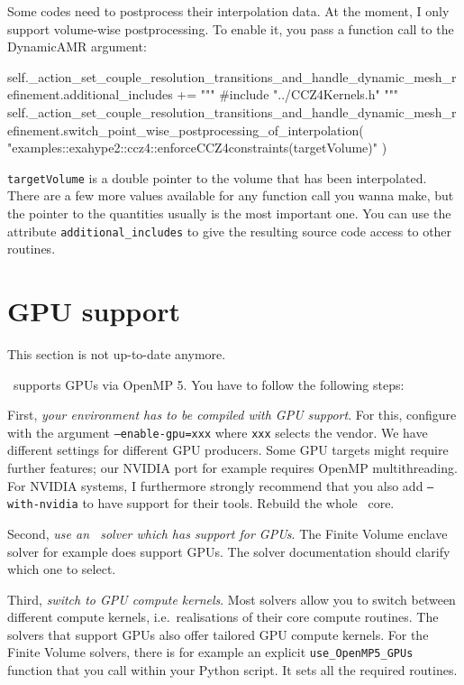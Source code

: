 \noindent
Some codes need to postprocess their interpolation data. At the moment, I only support volume-wise postprocessing.
To enable it, you pass a function call to the DynamicAMR argument: 
\begin{code}
        self._action_set_couple_resolution_transitions_and_handle_dynamic_mesh_refinement.additional_includes += """ 
#include "../CCZ4Kernels.h"
            """
self._action_set_couple_resolution_transitions_and_handle_dynamic_mesh_refinement.switch_point_wise_postprocessing_of_interpolation(
"examples::exahype2::ccz4::enforceCCZ4constraints(targetVolume)" )
\end{code}

\noindent
\texttt{targetVolume} is a double pointer to the volume that has been interpolated.
There are a few more values available for any function call you wanna make, but
the pointer to the quantities usually is the most important one.
You can use the attribute \texttt{additional\_includes} to give the resulting
source code access to other routines.



\section{GPU support}


\begin{remark}
 This section is not up-to-date anymore.
\end{remark}


\ExaHyPE\ supports GPUs via OpenMP 5.
You have to follow the following steps:


First, \emph{your environment has to be compiled with GPU support}.
For this, configure with the argument \texttt{--enable-gpu=xxx} where
\texttt{xxx} selects the vendor.
We have different settings for different GPU producers.
Some GPU targets might require further features; our NVIDIA port for example
requires OpenMP multithreading.
For NVIDIA systems, I furthermore strongly
recommend that you also add \texttt{--with-nvidia} to have support for their tools.
Rebuild the whole \Peano\ core.


Second, \emph{use an \ExaHyPE\ solver which has support for GPUs}. 
The Finite Volume enclave solver for example does support GPUs. 
The solver documentation should clarify which one to select.


Third, \emph{switch to GPU compute kernels}.
Most solvers allow you to switch between different compute kernels,
i.e.~realisations of their core compute routines.
The solvers that support GPUs also offer tailored GPU compute kernels.
For the Finite Volume solvers, there is for example an explicit
\texttt{use\_OpenMP5\_GPUs} function that you call within your Python
script.
It sets all the required routines.



